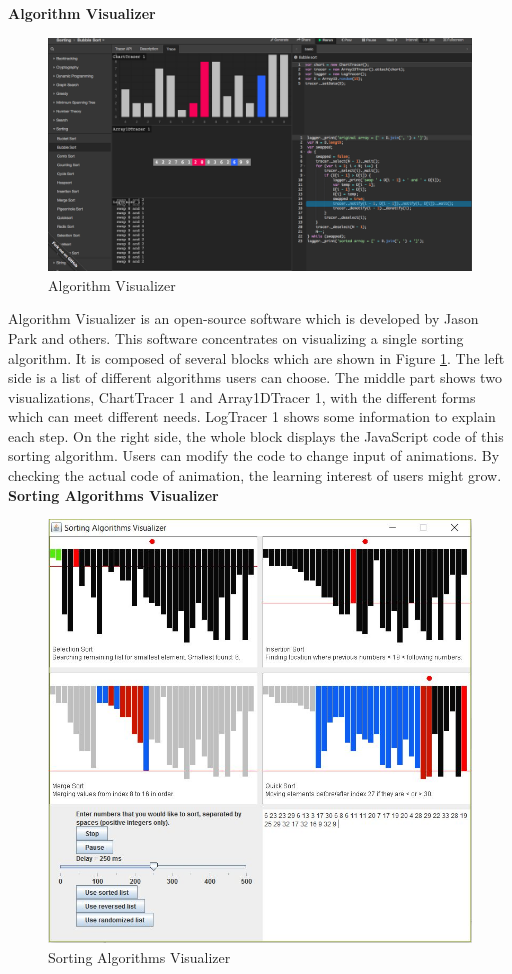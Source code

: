 \documentclass[paper=a4, fontsize=11pt,twoside]{scrartcl}		%
\begin{document}
\textbf{Algorithm Visualizer}\\
\begin{figure}[htbp]
\centering
\includegraphics[width=.8\textwidth]{algo-visualizer.png}
\caption{Algorithm Visualizer}
\label{Algorithm Visualizer}
\end{figure}

Algorithm Visualizer is an open-source software which is developed by Jason Park and others. This software concentrates on visualizing a single sorting algorithm. It is composed of several blocks which are shown in Figure \ref{Algorithm Visualizer}. The left side is a list of different algorithms users can choose. The middle part shows two visualizations, ChartTracer 1 and Array1DTracer 1, with the different forms which can meet different needs. LogTracer 1 shows some information to explain each step. On the right side, the whole block displays the JavaScript code of this sorting algorithm. Users can modify the code to change input of animations. By checking the actual code of animation, the learning interest of users might grow. \\


\textbf{Sorting Algorithms Visualizer}\\
\begin{figure}[htbp]
\centering
\includegraphics[width=.6\textwidth]{SortingAlgorithmvisualizer.JPG}
\caption{Sorting Algorithms Visualizer}
\label{SortingAlgorithmvisualizer}
\end{figure}
\end{document}
